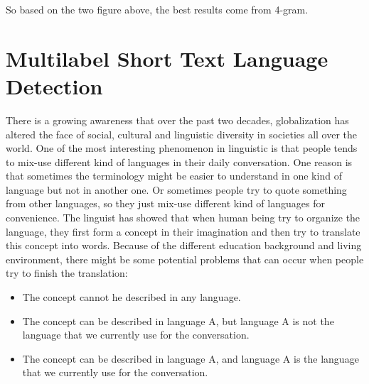 \documentclass[11pt]{article}
\begin{document}
So based on the two figure above, the best results come from 4-gram.




\section{Multilabel Short Text Language Detection}

There is a growing awareness that over the past two decades, globalization has altered the face of social, cultural and linguistic diversity in societies all over the world. One of the most interesting phenomenon in linguistic is that people tends to mix-use different kind of languages in their daily conversation. One reason is that sometimes the terminology might be easier to understand in one kind of language but not in another one. Or sometimes people try to quote something from other languages, so they just mix-use different kind of languages for convenience. The linguist has showed that when human being try to organize the language, they first form a concept in their imagination and then try to translate this concept into words. Because of the different education background and living environment, there might be some potential problems that can occur when people try to finish the translation:

\begin{itemize}
\item The concept cannot he described in any language.
\item The concept can be described in language A, but language A is not the language that we currently use for the conversation.
\item The concept can be described in language A, and language A is the language that we currently use for the conversation.
\end{itemize}
\end{document}
